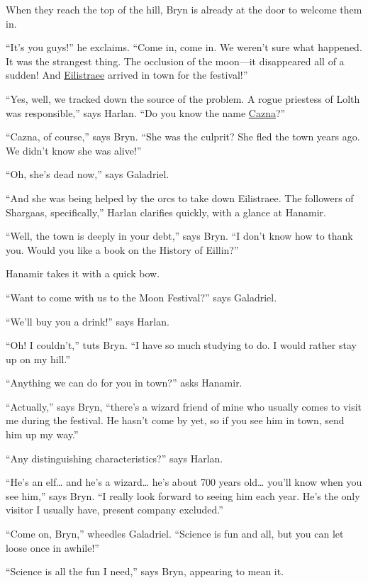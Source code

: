 \documentclass[smalldemyvopaper,11pt,twoside,onecolumn,openright,extrafontsizes]{memoir}
\begin{document}
When they reach the top of the hill, Bryn is already at the door to
welcome them in.

``It's you guys!'' he exclaims. ``Come in, come in. We weren't sure what
happened. It was the strangest thing. The occlusion of the moon---it
disappeared all of a sudden! And
\href{/characters/eilistraee/}{Eilistraee} arrived in town for the
festival!''

``Yes, well, we tracked down the source of the problem. A rogue
priestess of Lolth was responsible,'' says Harlan. ``Do you know the
name \href{/characters/cazna/}{Cazna}?''

``Cazna, of course,'' says Bryn. ``She was the culprit? She fled the
town years ago. We didn't know she was alive!''

``Oh, she's dead now,'' says Galadriel.

``And she was being helped by the orcs to take down Eilistraee. The
followers of Shargaas, specifically,'' Harlan clarifies quickly, with a
glance at Hanamir.

``Well, the town is deeply in your debt,'' says Bryn. ``I don't know how
to thank you. Would you like a book on the History of Eillin?''

Hanamir takes it with a quick bow.

``Want to come with us to the Moon Festival?'' says Galadriel.

``We'll buy you a drink!'' says Harlan.

``Oh! I couldn't,'' tuts Bryn. ``I have so much studying to do. I would
rather stay up on my hill.''

``Anything we can do for you in town?'' asks Hanamir.

``Actually,'' says Bryn, ``there's a wizard friend of mine who usually
comes to visit me during the festival. He hasn't come by yet, so if you
see him in town, send him up my way.''

``Any distinguishing characteristics?'' says Harlan.

``He's an elf\ldots{} and he's a wizard\ldots{} he's about 700 years
old\ldots{} you'll know when you see him,'' says Bryn. ``I really look
forward to seeing him each year. He's the only visitor I usually have,
present company excluded.''

``Come on, Bryn,'' wheedles Galadriel. ``Science is fun and all, but you
can let loose once in awhile!''

``Science is all the fun I need,'' says Bryn, appearing to mean it.
\end{document}
